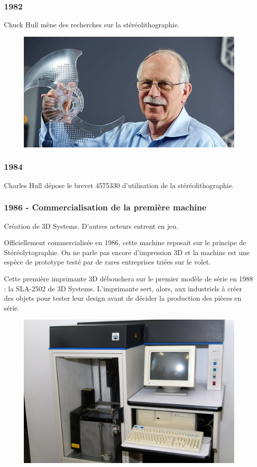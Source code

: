 \documentclass{article}
\begin{document}
\subsubsection{1982}
Chuck Hull mène des recherches sur la stéréolithographie.
\begin{figure}[h!]
\centering
\includegraphics[scale=0.3]{./images/charleshull.jpg}
\end{figure}
\subsubsection{1984}
Charles Hull dépose le brevet 4575330 d’utilisation de la stéréolithographie.
\subsubsection{1986 - Commercialisation de la première machine}
Création de 3D Systems. D’autres acteurs entrent en jeu.

Officiellement commercialisée en 1986, cette machine reposait sur le principe de Stéréolytographie.
On ne parle pas encore d'impression 3D et la machine est une espèce de prototype testé par de rares entreprises triées sur le volet.

Cette première imprimante 3D débouchera sur le premier modèle de série en 1988 : la SLA-2502 de 3D Systems.
L'imprimante sert, alors, aux industriels à créer des objets pour tester leur design avant de décider la production des pièces en série.

\begin{figure}[h!]
\centering
\includegraphics[scale=0.3]{./images/SLA-2502-3D-Systems.png}
\end{figure}
\end{document}
